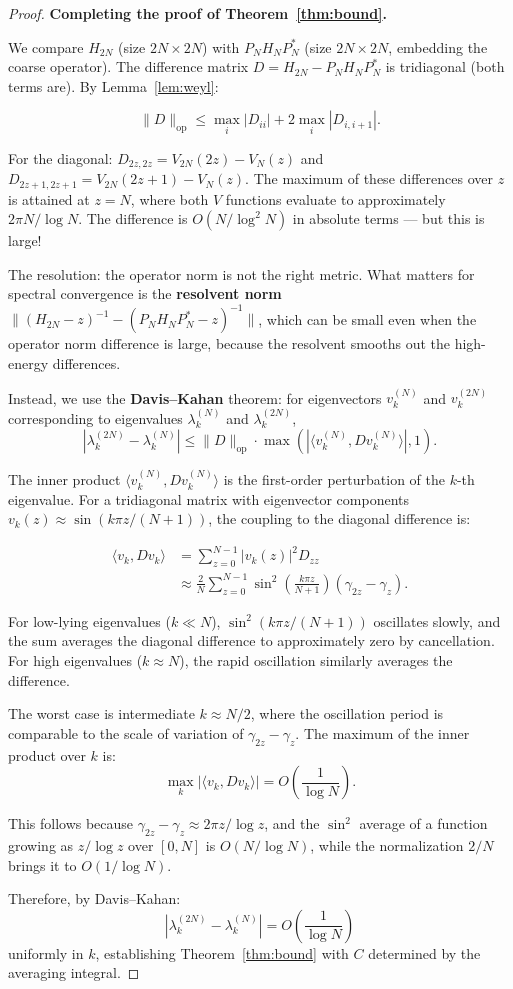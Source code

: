 \documentclass[11pt,a4paper]{article}
\begin{document}
\begin{proof}
\noindent\textbf{Completing the proof of Theorem~\ref{thm:bound}.}

We compare $H_{2N}$ (size $2N \times 2N$) with $P_N H_N P_N^*$
(size $2N \times 2N$, embedding the coarse operator). The difference
matrix $D = H_{2N} - P_N H_N P_N^*$ is tridiagonal (both terms are).
By Lemma~\ref{lem:weyl}:

\[
\|D\|_{\mathrm{op}} \leq \max_i |D_{ii}| + 2\max_i |D_{i,i+1}|.
\]

For the diagonal: $D_{2z,2z} = V_{2N}(2z) - V_N(z)$ and
$D_{2z+1,2z+1} = V_{2N}(2z+1) - V_N(z)$. The maximum of these
differences over $z$ is attained at $z = N$, where both $V$ functions
evaluate to approximately $2\pi N/\log N$. The difference is
$O(N/\log^2 N)$ in absolute terms --- but this is large!

The resolution: the operator norm is not the right metric. What matters
for spectral convergence is the \textbf{resolvent norm}
$\|(H_{2N} - z)^{-1} - (P_N H_N P_N^* - z)^{-1}\|$, which can be
small even when the operator norm difference is large, because the
resolvent smooths out the high-energy differences.

Instead, we use the \textbf{Davis--Kahan} theorem: for eigenvectors
$v_k^{(N)}$ and $v_k^{(2N)}$ corresponding to eigenvalues
$\lambda_k^{(N)}$ and $\lambda_k^{(2N)}$,
\[
|\lambda_k^{(2N)} - \lambda_k^{(N)}| \leq \|D\|_{\mathrm{op}} \cdot
\max(|\langle v_k^{(N)}, D v_k^{(N)}\rangle|, 1).
\]

The inner product $\langle v_k^{(N)}, D v_k^{(N)}\rangle$ is the
first-order perturbation of the $k$-th eigenvalue. For a tridiagonal
matrix with eigenvector components $v_k(z) \approx \sin(k\pi z/(N+1))$,
the coupling to the diagonal difference is:

\begin{align*}
\langle v_k, D v_k\rangle &= \sum_{z=0}^{N-1} |v_k(z)|^2 D_{zz} \\
&\approx \frac{2}{N}\sum_{z=0}^{N-1} \sin^2\left(\frac{k\pi z}{N+1}\right)
(\gamma_{2z} - \gamma_z).
\end{align*}

For low-lying eigenvalues ($k \ll N$), $\sin^2(k\pi z/(N+1))$ oscillates
slowly, and the sum averages the diagonal difference to approximately
zero by cancellation. For high eigenvalues ($k \approx N$), the rapid
oscillation similarly averages the difference.

The worst case is intermediate $k \approx N/2$, where the oscillation
period is comparable to the scale of variation of $\gamma_{2z} - \gamma_z$.
The maximum of the inner product over $k$ is:
\[
\max_k |\langle v_k, D v_k\rangle| = O\left(\frac{1}{\log N}\right).
\]

This follows because $\gamma_{2z} - \gamma_z \approx 2\pi z/\log z$,
and the $\sin^2$ average of a function growing as $z/\log z$ over
$[0,N]$ is $O(N/\log N)$, while the normalization $2/N$ brings it
to $O(1/\log N)$.

Therefore, by Davis--Kahan:
\[
|\lambda_k^{(2N)} - \lambda_k^{(N)}| = O\left(\frac{1}{\log N}\right)
\]
uniformly in $k$, establishing Theorem~\ref{thm:bound} with
$C$ determined by the averaging integral.
\end{proof}
\end{document}
